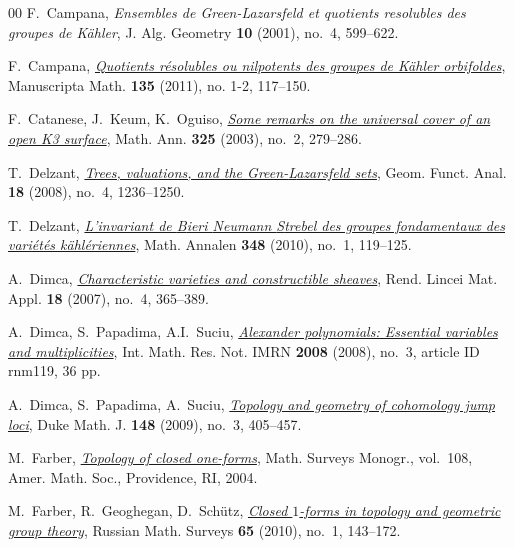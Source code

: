 \documentclass[11pt]{amsart}
\theoremstyle{definition}
\begin{document}
\begin{thebibliography}{00}
 F.~Campana, 
{\em Ensembles de {G}reen-{L}azarsfeld et 
quotients resolubles des groupes de K\"{a}hler},
J. Alg. Geometry \textbf{10} (2001), no.~4, 599--622.

  F.~Campana, 
\href{https://doi.org/10.1007/s00229-010-0413-x}%
{\em Quotients r\'{e}solubles ou nilpotents des groupes 
de K\"{a}hler orbifoldes}, Manuscripta Math. \textbf{135} 
(2011), no. 1-2, 117--150. 

 F.~Catanese, J.~Keum, K.~Oguiso, 
\href{https://dx.doi.org/10.1007/s00208-002-0376-7}%
{\em Some remarks on the universal cover of an open K3 surface},
Math. Ann. \textbf{325} (2003), no.~2, 279--286.

 T.~Delzant,
\href{https://dx.doi.org/10.1007/s00039-008-0679-2}%
{\em Trees, valuations, and the {G}reen-{L}azarsfeld sets}, 
Geom. Funct. Anal. \textbf{18} (2008), no.~4, 1236--1250. 

 T.~Delzant,
\href{https://dx.doi.org/10.1007/s00208-009-0468-8}%
{\em L'invariant de {B}ieri {N}eumann {S}trebel des groupes 
fondamentaux des vari\'{e}t\'{e}s k\"{a}hl\'{e}riennes}, 
Math. Annalen \textbf{348} (2010), no.~1, 119--125.

 A.~Dimca, 
\href{https://dx.doi.org/10.4171/RLM/503}%
{\em Characteristic varieties and constructible sheaves}, 
Rend. Lincei Mat. Appl. \textbf{18} (2007), no.~4, 365--389. 

 A.~Dimca, S.~Papadima, A.I.~Suciu,
\href{http://dx.doi.org/10.1093/imrn/rnm119}%
{\em Alexander polynomials: Essential variables and multiplicities}, 
Int. Math. Res. Not. IMRN \textbf{2008} (2008), 
no.~3, article ID rnm119, 36 pp. 

 A.~Dimca, S.~Papadima, A.~Suciu,
\href{https://dx.doi.org/10.1215/00127094-2009-030}%
{\em Topology and geometry of cohomology jump loci}, 
Duke Math. J. \textbf{148} (2009), no.~3, 405--457.

 M.~Farber, 
\href{https://dx.doi.org/10.1090/surv/108}%
{\em Topology of closed one-forms}, 
Math. Surveys Monogr., vol.~108, Amer. Math. Soc., 
Providence, RI, 2004. 

 M.~Farber, R.~Geoghegan, D.~Sch\"{u}tz, 
\href{https://dx.doi.org/10.1070/RM2010v065n01ABEH004663}%
{\em Closed $1$-forms in topology and geometric group theory},
Russian Math. Surveys \textbf{65} (2010), no.~1, 143--172.


\end{thebibliography}
\end{document}
